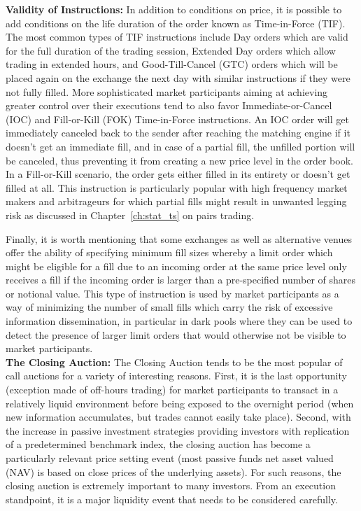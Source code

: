 \noindent\textbf{Validity of Instructions:} In addition to conditions on price, it is possible to add conditions on the life duration of the order known as Time-in-Force (TIF). The most common types of TIF instructions include Day orders which are valid for the full duration of the trading session, Extended Day orders which allow trading in extended hours, and Good-Till-Cancel (GTC) orders which will be placed again on the exchange the next day with similar instructions if they were not fully filled. More sophisticated market participants aiming at achieving greater control over their executions tend to also favor Immediate-or-Cancel (IOC) and Fill-or-Kill (FOK) Time-in-Force instructions. An IOC order will get immediately canceled back to the sender after reaching the matching engine if it doesn't get an immediate fill, and in case of a partial fill, the unfilled portion will be canceled, thus preventing it from creating a new price level in the order book. In a Fill-or-Kill scenario, the order gets either filled in its entirety or doesn't get filled at all. This instruction is particularly popular with high frequency market makers and arbitrageurs for which partial fills might result in unwanted legging risk as discussed in Chapter~\ref{ch:stat_ts} on pairs trading.


Finally, it is worth mentioning that some exchanges as well as alternative venues offer the ability of specifying minimum fill sizes whereby a limit order which might be eligible for a fill due to an incoming order at the same price level only receives a fill if the incoming order is larger than a pre-specified number of shares or notional value. This type of instruction is used by market participants as a way of minimizing the number of small fills which carry the risk of excessive information dissemination, in particular in dark pools where they can be used to detect the presence of larger limit orders that would otherwise not be visible to market participants.  \\


\noindent\textbf{The Closing Auction:} The Closing Auction tends to be the most popular of call auctions for a variety of interesting reasons. First, it is the last opportunity (exception made of off-hours trading) for market participants to transact in a relatively liquid environment before being exposed to the overnight period (when new information accumulates, but trades cannot easily take place). Second, with the increase in passive investment strategies providing investors with replication of a predetermined benchmark index, the closing auction has become a particularly relevant price setting event (most passive funds net asset valued (NAV) is based on close prices of the underlying assets). For such reasons, the closing auction is extremely important to many investors. From an execution standpoint, it is a major liquidity event that needs to be considered carefully.


